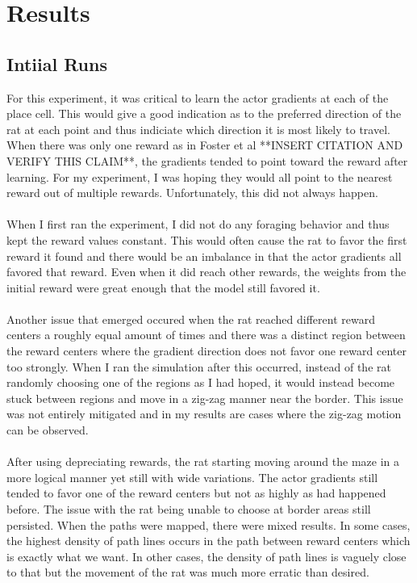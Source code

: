 \documentclass[conference]{IEEEtran}
\begin{document}
\section{Results}

\subsection{Intiial Runs}

For this experiment, it was critical to learn the actor gradients at each of the place cell. This would give a good indication as to the preferred direction of the rat at each point and thus indiciate which direction it is most likely to travel. When there was only one reward as in Foster et al **INSERT CITATION AND VERIFY THIS CLAIM**, the gradients tended to point toward the reward after learning. For my experiment, I was hoping they would all point to the nearest reward out of multiple rewards. Unfortunately, this did not always happen. \\
\\
When I first ran the experiment, I did not do any foraging behavior and thus kept the reward values constant. This would often cause the rat to favor the first reward it found and there would be an imbalance in that the actor gradients all favored that reward. Even when it did reach other rewards, the weights from the initial reward were great enough that the model still favored it. \\
\\
Another issue that emerged occured when the rat reached different reward centers a roughly equal amount of times and there was a distinct region between the reward centers where the gradient direction does not favor one reward center too strongly. When I ran the simulation after this occurred, instead of the rat randomly choosing one of the regions as I had hoped, it would instead become stuck between regions and move in a zig-zag manner near the border. This issue was not entirely mitigated and in my results are cases where the zig-zag motion can be observed.\\
\\
After using depreciating rewards, the rat starting moving around the maze in a more logical manner yet still with wide variations. The actor gradients still tended to favor one of the reward centers but not as highly as had happened before. The issue with the rat being unable to choose at border areas still persisted. When the paths were mapped, there were mixed results. In some cases, the highest density of path lines occurs in the path between reward centers which is exactly what we want. In other cases, the density of path lines is vaguely close to that but the movement of the rat was much more erratic than desired.
\end{document}

